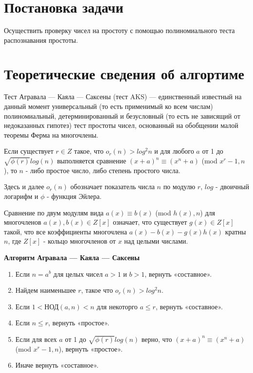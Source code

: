 \documentclass[spec, och, labwork]{shiza}
\begin{document}
\tableofcontents

\section{Постановка задачи}

Осуществить проверку чисел на простоту с помощью полиномиального теста распознавания простоты.

\section{Теоретические сведения об алгортиме}

Тест Агравала — Каяла — Саксены (тест AKS) — единственный известный
на данный момент универсальный (то есть применимый ко всем числам)
полиномиальный, детерминированный и безусловный (то есть не зависящий
от недоказанных гипотез) тест простоты чисел, основанный на обобщении
малой теоремы Ферма на многочлены.

Если существует $r \in Z$ такое, что $o_r(n) > log^2n$ и для любого $a$
от 1 до $\sqrt{\phi(r)}log(n)$ выполняется сравнение $(x + a)^n \equiv (x^n + a)$
(mod $x^r-1, n$), то $n$ - либо простое число, либо степень простого числа.

Здесь и далее $o_r(n)$ обозначает показатель числа $n$ по модулю $r$, $log$ -
двоичный логарифм и $\phi$ - функция Эйлера.

Сравнение по двум модулям вида $a(x) \equiv b(x)$ (mod $h(x), n$) для многочленов
$a(x), b(x) \in Z[x]$ означает, что существует $g(x) \in Z[x]$ такой, что все 
коэффициенты многочлена $a(x) - b(x) - g(x)h(x)$ кратны $n$, где $Z[x]$ - 
кольцо многочленов от $x$ над целыми числами.

\textbf{Алгоритм Агравала — Каяла — Саксены}

\begin{enumerate}
    \item Если $n = a^b$ для целых чисел $a > 1$ и $b > 1$, вернуть «составное».
    \item Найдем наименьшее $r$, такое что $o_r(n) > log^2n$.
    \item Если $1< \text{НОД} (a, n)<n$ для некоторго $a \leq r$, вернуть «составное».
    \item Если $n \leq r$, вернуть «простое».
    \item Если для всех $a$ от 1 до $\sqrt{\phi(r)}log(n)$ верно, что $(x + a)^n \equiv (x^n + a)$
    (mod $x^r-1, n$), вернуть «простое».
    \item Иначе вернуть «составное».
\end{enumerate}
\end{document}
